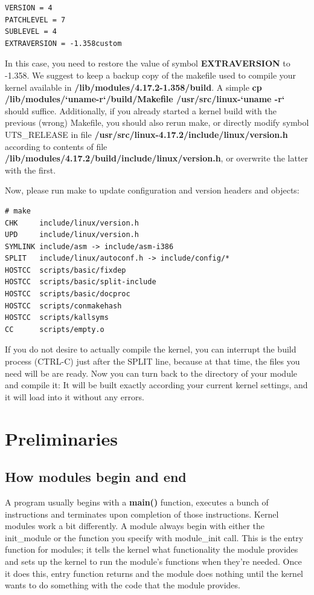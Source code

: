 \documentclass[11pt]{article}
\begin{document}
\begin{verbatim}
VERSION = 4
PATCHLEVEL = 7
SUBLEVEL = 4
EXTRAVERSION = -1.358custom
\end{verbatim}

In this case, you need to restore the value of symbol \textbf{EXTRAVERSION} to -1.358. We suggest to keep a backup copy of the makefile used to compile your kernel available in \textbf{/lib/modules/4.17.2-1.358/build}. A simple \textbf{cp /lib/modules/`uname-r`/build/Makefile /usr/src/linux-`uname -r`} should suffice. Additionally, if you already started a kernel build with the previous (wrong) Makefile, you should also rerun make, or directly modify symbol UTS\_RELEASE in file \textbf{/usr/src/linux-4.17.2/include/linux/version.h} according to contents of file \textbf{/lib/modules/4.17.2/build/include/linux/version.h}, or overwrite the latter with the first.

Now, please run make to update configuration and version headers and objects:

\begin{verbatim}
# make
CHK     include/linux/version.h
UPD     include/linux/version.h
SYMLINK include/asm -> include/asm-i386
SPLIT   include/linux/autoconf.h -> include/config/*
HOSTCC  scripts/basic/fixdep
HOSTCC  scripts/basic/split-include
HOSTCC  scripts/basic/docproc
HOSTCC  scripts/conmakehash
HOSTCC  scripts/kallsyms
CC      scripts/empty.o
\end{verbatim}

If you do not desire to actually compile the kernel, you can interrupt the build process (CTRL-C) just after the SPLIT line, because at that time, the files you need will be are ready. Now you can turn back to the directory of your module and compile it: It will be built exactly according your current kernel settings, and it will load into it without any errors.

\section*{Preliminaries}
\label{sec-5}
\subsection*{How modules begin and end}
\label{sec-5-1}
A program usually begins with a \textbf{main()} function, executes a bunch of instructions and terminates upon completion of those instructions. Kernel modules work a bit differently. A module always begin with either the init\_module or the function you specify with module\_init call. This is the entry function for modules; it tells the kernel what functionality the module provides and sets up the kernel to run the module's functions when they're needed. Once it does this, entry function returns and the module does nothing until the kernel wants to do something with the code that the module provides.
\end{document}
